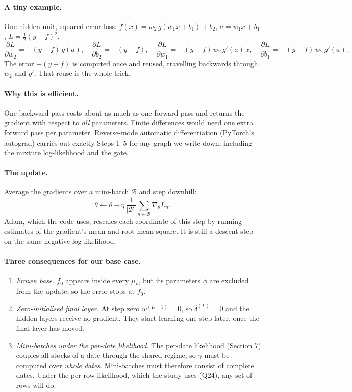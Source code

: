 \paragraph{A tiny example.} One hidden unit, squared-error loss: $f(x)=w_2\,g(w_1x+b_1)+b_2$, $a=w_1x+b_1$, $L=\frac12(y-f)^2$.
\begin{equation}
\frac{\partial L}{\partial w_2}=-(y-f)\,g(a),\quad\frac{\partial L}{\partial b_2}=-(y-f),\quad\frac{\partial L}{\partial w_1}=-(y-f)\,w_2\,g'(a)\,x,\quad\frac{\partial L}{\partial b_1}=-(y-f)\,w_2\,g'(a).
\end{equation}
The error $-(y-f)$ is computed once and reused, travelling backwards through $w_2$ and $g'$. That reuse is the whole trick.

\paragraph{Why this is efficient.} One backward pass costs about as much as one forward pass and returns the gradient with respect to \emph{all} parameters. Finite differences would need one extra forward pass per parameter. Reverse-mode automatic differentiation (PyTorch's autograd) carries out exactly Steps 1--5 for any graph we write down, including the mixture log-likelihood and the gate.

\paragraph{The update.} Average the gradients over a mini-batch $\mathcal B$ and step downhill:
\begin{equation}
\theta\leftarrow\theta-\eta\,\frac{1}{|\mathcal B|}\sum_{n\in\mathcal B}\nabla_\theta L_n.
\end{equation}
Adam, which the code uses, rescales each coordinate of this step by running estimates of the gradient's mean and root mean square. It is still a descent step on the same negative log-likelihood.

\paragraph{Three consequences for our base case.}
\begin{enumerate}
  \item \emph{Frozen base.} $f_0$ appears inside every $\mu_k$, but its parameters $\phi$ are excluded from the update, so the error stops at $f_0$.
  \item \emph{Zero-initialised final layer.} At step zero $w^{(L+1)}=0$, so $\delta^{(L)}=0$ and the hidden layers receive no gradient. They start learning one step later, once the final layer has moved.
  \item \emph{Mini-batches under the per-date likelihood.} The per-date likelihood (Section 7) couples all stocks of a date through the shared regime, so $\gamma$ must be computed over \emph{whole dates}. Mini-batches must therefore consist of complete dates. Under the per-row likelihood, which the study uses (Q24), any set of rows will do.
\end{enumerate}
\newpage
